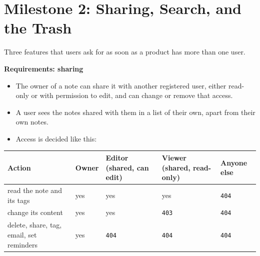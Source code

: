 \setcounter{section}{2}
\section{Milestone 2: Sharing, Search, and the Trash}\label{44-project-notes-for-many-users:443-milestone-2-sharing-search-and-the-trash}

Three features that users ask for as soon as a product has more than one user.

\textbf{Requirements: sharing}

\begin{itemize}
\tightlist
\item
  The owner of a note can share it with another registered user, either read-only or with permission to edit, and can change or remove that access.
\item
  A user sees the notes shared with them in a list of their own, apart from their own notes.
\item
  Access is decided like this:
\end{itemize}


{\def\LTcaptype{none} %
\begin{longtable}[]{@{}
  >{\raggedright\arraybackslash}p{}
  >{\raggedright\arraybackslash}p{}
  >{\raggedright\arraybackslash}p{}
  >{\raggedright\arraybackslash}p{}
  >{\raggedright\arraybackslash}p{}@{}}
\toprule\noalign{}
\begin{minipage}[b]{\linewidth}\raggedright
Action
\end{minipage} & \begin{minipage}[b]{\linewidth}\raggedright
Owner
\end{minipage} & \begin{minipage}[b]{\linewidth}\raggedright
Editor (shared, can edit)
\end{minipage} & \begin{minipage}[b]{\linewidth}\raggedright
Viewer (shared, read-only)
\end{minipage} & \begin{minipage}[b]{\linewidth}\raggedright
Anyone else
\end{minipage} \\
\midrule\noalign{}
\endhead
\bottomrule\noalign{}
\endlastfoot
read the note and its tags & yes & yes & yes & \texttt{404} \\
change its content & yes & yes & \texttt{403} & \texttt{404} \\
delete, share, tag, email, set reminders & yes & \texttt{404} & \texttt{404} & \texttt{404} \\
\end{longtable}
}

